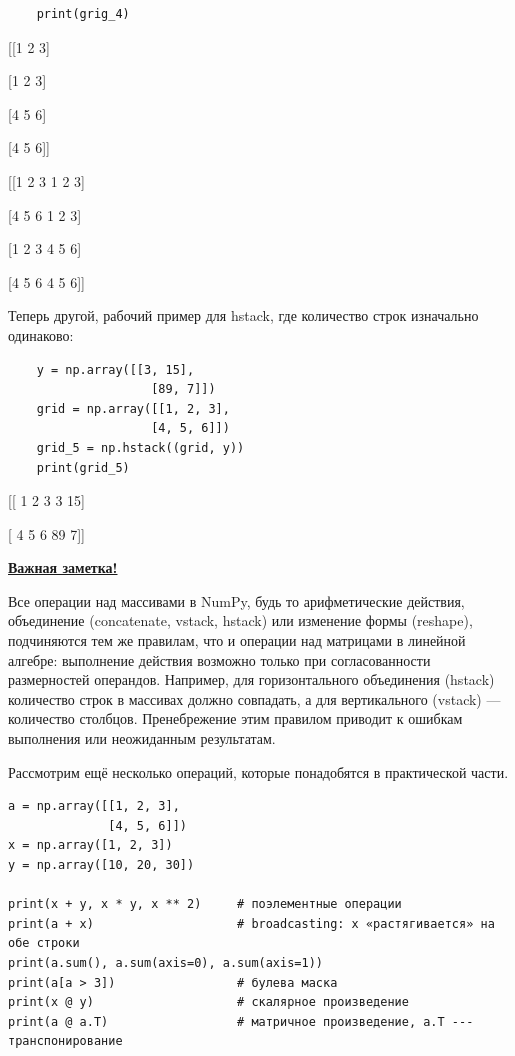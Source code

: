 \documentclass[pract]{SCWorks}
\begin{document}
\begin{itemize}
\begin{verbatim}
    print(grig_4)
    \end{verbatim}

    [[1 2 3]
    
    [1 2 3]
    
    [4 5 6]
    
    [4 5 6]]

    [[1 2 3 1 2 3]

    [4 5 6 1 2 3]

    [1 2 3 4 5 6]

    [4 5 6 4 5 6]]

    Теперь другой, рабочий пример для hstack, где количество строк изначально одинаково:
    \begin{verbatim}
    y = np.array([[3, 15],
                    [89, 7]])
    grid = np.array([[1, 2, 3],
                    [4, 5, 6]])
    grid_5 = np.hstack((grid, y))
    print(grid_5)
    \end{verbatim}

    [[ 1  2  3  3 15]
    
    [ 4  5  6 89  7]]
\end{itemize}

\underline{\textbf{Важная заметка!}}

Все операции над массивами в NumPy, будь то арифметические действия, объединение (concatenate, vstack, hstack) или 
изменение формы (reshape), подчиняются тем же правилам, что и операции над матрицами в линейной алгебре: 
выполнение действия возможно только при согласованности размерностей операндов. Например, для горизонтального объединения (hstack) 
количество строк в массивах должно совпадать, а для вертикального (vstack) — количество столбцов. Пренебрежение этим 
правилом приводит к ошибкам выполнения или неожиданным результатам.

Рассмотрим ещё несколько операций, которые понадобятся в практической части.

\begin{verbatim}
a = np.array([[1, 2, 3],
              [4, 5, 6]])
x = np.array([1, 2, 3])
y = np.array([10, 20, 30])

print(x + y, x * y, x ** 2)     # поэлементные операции
print(a + x)                    # broadcasting: x «растягивается» на обе строки
print(a.sum(), a.sum(axis=0), a.sum(axis=1))
print(a[a > 3])                 # булева маска
print(x @ y)                    # скалярное произведение
print(a @ a.T)                  # матричное произведение, a.T --- транспонирование
\end{verbatim}
\end{document}
